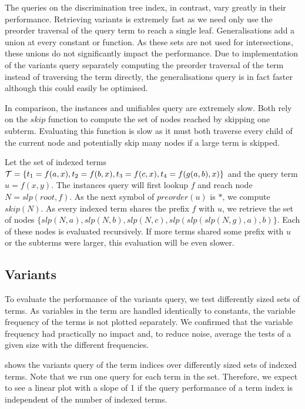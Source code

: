 The queries on the discrimination tree index, in contrast, vary greatly in their performance.
Retrieving variants is extremely fast as we need only use the preorder traversal of the query term to reach a single leaf. Generalisations add a union at every constant or function. As these sets are not used for intersections, these unions do not significantly impact the performance. Due to implementation of the variants query separately computing the preorder traversal of the term instead of traversing the term directly, the generalisations query is in fact faster although this could easily be optimised.

In comparison, the instances and unifiables query are extremely slow.
Both rely on the $skip$ function to compute the set of nodes reached by skipping one subterm.
Evaluating this function is slow as it must both traverse every child of the current node and potentially skip many nodes if a large term is skipped.

\begin{exmpl}
  Let the set of indexed terms $\mathcal{T} = \{t_{1} = f(a,x), t_{2} = f(b,x), t_{3} = f(c,x), t_{4} = f(g(a,b),x)\}$ and the query term $u = f(x,y)$.
  The instances query will first lookup $f$ and reach node $N = slp(root,f)$. As the next symbol of $preorder(u)$ is $*$, we compute $skip(N)$. As every indexed term shares the prefix $f$ with $u$, we retrieve the set of nodes $\{slp(N,a), slp(N,b), slp(N,c), slp(slp(slp(N,g),a),b)\}$. Each of these nodes is evaluated recursively.
  If more terms shared some prefix with $u$ or the subterms were larger, this evaluation will be even slower.
\end{exmpl}

\subsection{Variants}
To evaluate the performance of the variants query, we test differently sized sets of terms. As variables in the term are handled identically to constants, the variable frequency of the terms is not plotted separately. We confirmed that the variable frequency had practically no impact and, to reduce noise, average the tests of a given size with the different frequencies.

 shows the variants query of the term indices over differently sized sets of indexed terms. Note that we run one query for each term in the set. Therefore, we expect to see a linear plot with a slope of 1 if the query performance of a term index is independent of the number of indexed terms.

